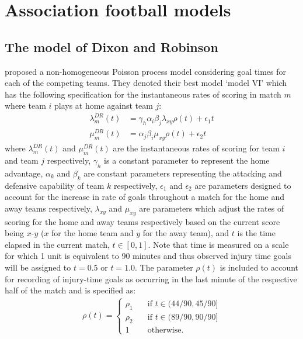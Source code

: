 \section{Association football models}
\label{sec:Association_football_models}
 
\subsection{The model of Dixon and Robinson} 
\label{DR}

\cite{DixonRobinson1998} proposed a non-homogeneous Poisson process model considering goal times for each of the
competing teams. They denoted their best model `model VI' which has the following specification for the instantaneous
rates of scoring in match \(m\) where team \(i\) plays at home against team \(j\):
\begin{align}
\lambda_m^{DR}(t) &= \gamma_h \alpha_i \beta_j \lambda_{xy} \rho(t) + \epsilon_1 t\\
\mu_m^{DR}(t) &= \alpha_j \beta_i \mu_{xy} \rho(t) + \epsilon_2 t 
\end{align}
where \(\lambda_m^{DR}(t)\) and \(\mu_m^{DR}(t)\) are the instantaneous rates of scoring for team \(i\) and team \(j\)
respectively, \(\gamma_h\) is a constant parameter to represent the home advantage, \(\alpha_k\) and \(\beta_k\) are
constant parameters representing the attacking and defensive capability of team \(k\) respectively, \(\epsilon_1\) and
\(\epsilon_2\) are parameters designed to account for the increase in rate of goals throughout a match for the home and
away teams respectively, \(\lambda_{xy}\) and \(\mu_{xy}\) are parameters which adjust the rates of scoring for the home
and away teams respectively based on the current score being \(x\)-\(y\) (\(x\) for the home team and \(y\) for the away
team), and \(t\) is the time elapsed in the current match, \(t \in [0, 1]\). Note that time is measured on a scale for
which 1 unit is equivalent to 90 minutes and thus observed injury time goals will be assigned to \(t=0.5\) or \(t=1.0\).
The parameter \(\rho(t)\) is included to account for recording of injury-time goals as occurring in the last minute of
the respective half of the match and is specified as:
\begin{align}
\rho(t) = \left \{
\begin{array}{ll}
\rho_1 \quad &\text{if \(t \in (44/90, 45/90]\)}\\
\rho_2 \quad &\text{if \(t \in (89/90, 90/90]\)}\\
1      \quad &\text{otherwise.}
\end{array} \right.
\end{align}
